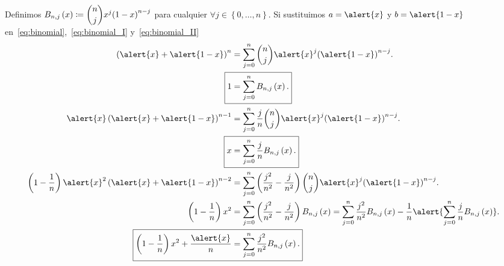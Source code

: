 \begin{frame}
    Definimos
    \begin{math}
        B_{n,j}\left(x\right)\coloneqq
        \dbinom{n}{j}
        x^{j}
            {\left(1-x\right)}^{n-j}
    \end{math}
    para cualquier
    \begin{math}
        \forall j\in\left\{0,\dotsc,n\right\}
    \end{math}.
    Si sustituimos $a=\alert{x}$ y $b=\alert{1-x}$
    en~\eqref{eq:binomial},~\eqref{eq:binomial_I}
    y~\eqref{eq:binomial_II}
    \begin{align}
        \left(\alert{x}+\alert{1-x}\right)^{n} & =
        \sum\limits_{j=0}^{n}
        \dbinom{n}{j}
        \alert{x}^{j}
        {\left(\alert{1-x}\right)}^{n-j}. \notag   \\
        \Aboxed{
        1                                      & =
            \sum\limits_{j=0}^{n}
            B_{n,j}\left(x\right).
        }                                          \\
        \alert{x}\left(\alert{x}+\alert{1-x}\right)^{n-1}
                                               & =
        \sum\limits_{j=0}^{n}
        \dfrac{j}{n}
        \dbinom{n}{j}
        \alert{x}^{j}
        {\left(\alert{1-x}\right)}^{n-j}. \notag   \\
        \Aboxed{
            x
                                               & =
            \sum\limits_{j=0}^{n}
            \dfrac{j}{n}
            B_{n,j}\left(x\right).
        }                                          \\
        \left(1-\dfrac{1}{n}\right)
        \alert{x}^{2}
        \left(\alert{x}+\alert{1-x}\right)^{n-2}
                                               & =
        \sum\limits_{j=0}^{n}
        \left(
        \dfrac{j^{2}}{n^{2}}-
        \dfrac{j}{n^{2}}
        \right)
        \dbinom{n}{j}
        \alert{x}^{j}
        {\left(\alert{1-x}\right)}^{n-j}.
        \notag                                     \\
        \left(1-\dfrac{1}{n}\right)
        x^{2}
                                               & =
        \sum\limits_{j=0}^{n}
        \left(
        \dfrac{j^{2}}{n^{2}}-
        \dfrac{j}{n^{2}}
        \right)
        B_{n,j}\left(x\right)=
        \sum\limits_{j=0}^{n}
        \dfrac{j^{2}}{n^{2}}
        B_{n,j}\left(x\right)-
        \frac{1}{n}
        \alert{
            \sum\limits_{j=0}^{n}
            \dfrac{j}{n}
            B_{n,j}\left(x\right)
        }.
        \notag                                     \\
        \Aboxed{
            \left(1-\dfrac{1}{n}\right)
            x^{2}+
            \dfrac{\alert{x}}{n}
                                               & =
            \sum\limits_{j=0}^{n}
            \dfrac{j^{2}}{n^{2}}
            B_{n,j}\left(x\right).
        }
    \end{align}
\end{frame}